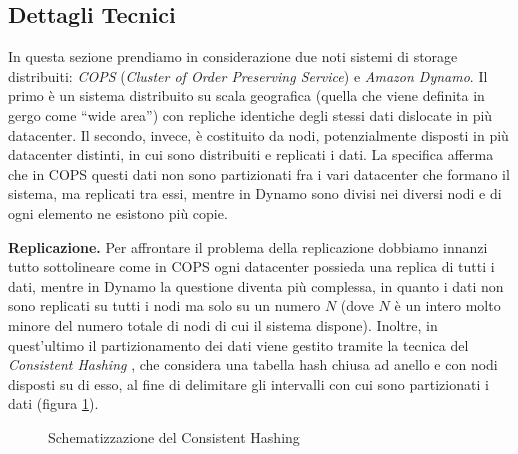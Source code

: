 \documentclass[twoside]{article}
\begin{document}
\begin{multicols}{2}
\section{Dettagli Tecnici}
\label{sec:dettagli-tecnici}
In questa sezione prendiamo in considerazione due noti sistemi di storage distribuiti: \emph{COPS} (\emph{Cluster of Order Preserving Service})\cite{bib:COPS} e \emph{Amazon Dynamo}\cite{bib:dynamo}. Il primo è un sistema distribuito su scala geografica (quella che viene definita in gergo come “wide area”) con repliche identiche degli stessi dati dislocate in più datacenter. Il secondo, invece, è costituito da nodi, potenzialmente disposti in più datacenter distinti, in cui sono distribuiti e replicati i dati. La specifica afferma che in COPS questi dati non sono partizionati fra i vari datacenter che formano il sistema, ma replicati tra essi, mentre in Dynamo sono divisi nei diversi nodi e di ogni elemento ne esistono più copie.

\textbf{Replicazione.} Per affrontare il problema della replicazione dobbiamo innanzi tutto sottolineare come in COPS ogni datacenter possieda una replica di tutti i dati, mentre in Dynamo la questione diventa più complessa, in quanto i dati non sono replicati su tutti i nodi ma solo su un numero $N$ (dove $N$ è un intero molto minore del numero totale di nodi di cui il sistema dispone). Inoltre, in quest'ultimo il partizionamento dei dati viene gestito tramite la tecnica del \emph{Consistent Hashing} \cite{bib:hashing}, che considera una tabella hash chiusa ad anello e con nodi disposti su di esso, al fine di delimitare gli intervalli con cui sono partizionati i dati (figura \ref{fig:consistent-hashing-ring}).
\begin{figure}[H]
\centering
{}
\caption{Schematizzazione del Consistent Hashing}
\label{fig:consistent-hashing-ring}
\end{figure}


\end{multicols}
\end{document}
